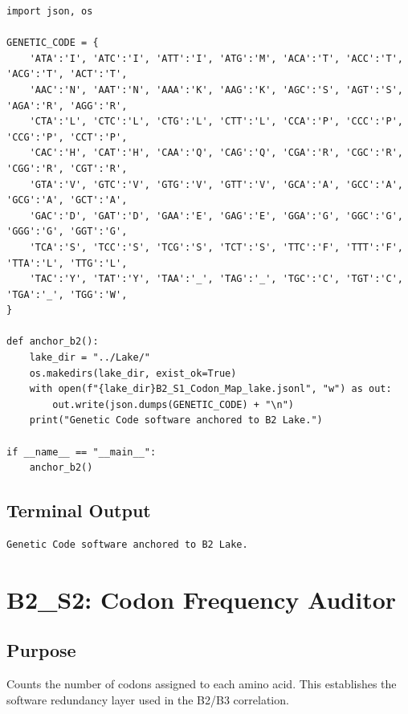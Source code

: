 \documentclass[11pt, letterpaper, openany]{book}
\begin{document}
\begin{lstlisting}[style=terminal]
import json, os

GENETIC_CODE = {
    'ATA':'I', 'ATC':'I', 'ATT':'I', 'ATG':'M', 'ACA':'T', 'ACC':'T', 'ACG':'T', 'ACT':'T',
    'AAC':'N', 'AAT':'N', 'AAA':'K', 'AAG':'K', 'AGC':'S', 'AGT':'S', 'AGA':'R', 'AGG':'R',
    'CTA':'L', 'CTC':'L', 'CTG':'L', 'CTT':'L', 'CCA':'P', 'CCC':'P', 'CCG':'P', 'CCT':'P',
    'CAC':'H', 'CAT':'H', 'CAA':'Q', 'CAG':'Q', 'CGA':'R', 'CGC':'R', 'CGG':'R', 'CGT':'R',
    'GTA':'V', 'GTC':'V', 'GTG':'V', 'GTT':'V', 'GCA':'A', 'GCC':'A', 'GCG':'A', 'GCT':'A',
    'GAC':'D', 'GAT':'D', 'GAA':'E', 'GAG':'E', 'GGA':'G', 'GGC':'G', 'GGG':'G', 'GGT':'G',
    'TCA':'S', 'TCC':'S', 'TCG':'S', 'TCT':'S', 'TTC':'F', 'TTT':'F', 'TTA':'L', 'TTG':'L',
    'TAC':'Y', 'TAT':'Y', 'TAA':'_', 'TAG':'_', 'TGC':'C', 'TGT':'C', 'TGA':'_', 'TGG':'W',
}

def anchor_b2():
    lake_dir = "../Lake/"
    os.makedirs(lake_dir, exist_ok=True)
    with open(f"{lake_dir}B2_S1_Codon_Map_lake.jsonl", "w") as out:
        out.write(json.dumps(GENETIC_CODE) + "\n")
    print("Genetic Code software anchored to B2 Lake.")

if __name__ == "__main__":
    anchor_b2()
\end{lstlisting}

\subsection*{Terminal Output}
\begin{lstlisting}[language=terminal]
Genetic Code software anchored to B2 Lake.
\end{lstlisting}


\section{B2\_S2: Codon Frequency Auditor}
\subsection*{Purpose}
Counts the number of codons assigned to each amino acid. This establishes the
software redundancy layer used in the B2/B3 correlation.
\end{document}
